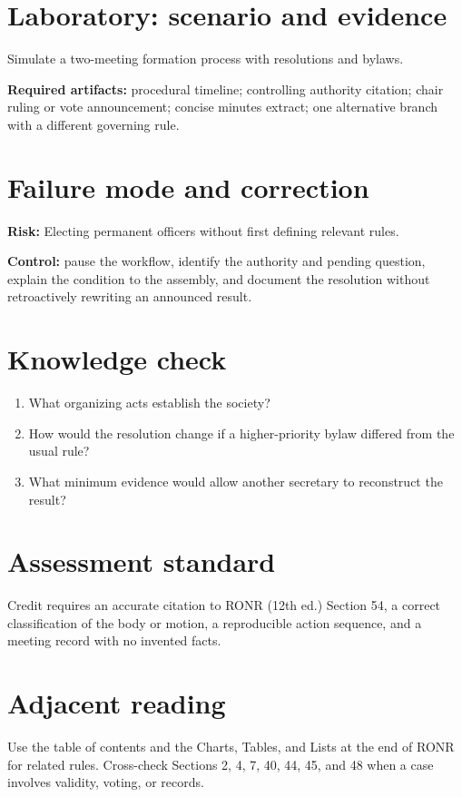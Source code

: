 \documentclass[11pt]{article}
\begin{document}
\section{Laboratory: scenario and evidence}
Simulate a two-meeting formation process with resolutions and bylaws.

\textbf{Required artifacts:} procedural timeline; controlling authority citation; chair ruling or vote announcement; concise minutes extract; one alternative branch with a different governing rule.

\section{Failure mode and correction}
\textbf{Risk:} Electing permanent officers without first defining relevant rules.

\textbf{Control:} pause the workflow, identify the authority and pending question, explain the condition to the assembly, and document the resolution without retroactively rewriting an announced result.

\section{Knowledge check}
\begin{enumerate}[leftmargin=*,itemsep=4pt]
\item What organizing acts establish the society?
\item How would the resolution change if a higher-priority bylaw differed from the usual rule?
\item What minimum evidence would allow another secretary to reconstruct the result?
\end{enumerate}

\section{Assessment standard}
Credit requires an accurate citation to RONR (12th ed.) Section 54, a correct classification of the body or motion, a reproducible action sequence, and a meeting record with no invented facts.

\section{Adjacent reading}
Use the table of contents and the Charts, Tables, and Lists at the end of RONR for related rules. Cross-check Sections 2, 4, 7, 40, 44, 45, and 48 when a case involves validity, voting, or records.
\end{document}
